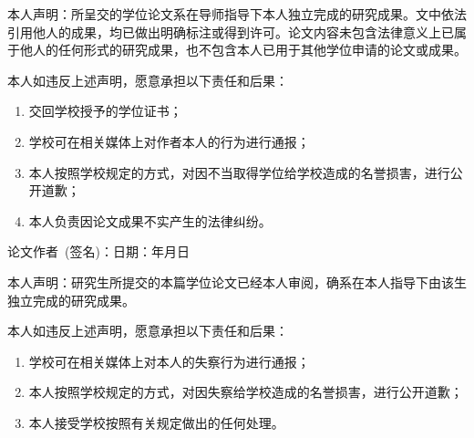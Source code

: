 
\fancyfoot[LE,RO]{}

\begin{center}\xiaowu\end{center}\vspace{-1cm}
\begin{center}\end{center}

本人声明：所呈交的学位论文系在导师指导下本人独立完成的研究成果。文中依法引用他人的成果，均已做出明确标注或得到许可。论文内容未包含法律意义上已属于他人的任何形式的研究成果，也不包含本人已用于其他学位申请的论文或成果。

本人如违反上述声明，愿意承担以下责任和后果：
\begin{enumerate}
\item 交回学校授予的学位证书；
\item 学校可在相关媒体上对作者本人的行为进行通报；
\item 本人按照学校规定的方式，对因不当取得学位给学校造成的名誉损害，进行公开道歉；
\item 本人负责因论文成果不实产生的法律纠纷。
\end{enumerate}

\vspace{1em}
论文作者~(签名)：\hfill 日期：\hspace{4em}年\hspace{2em}月\hspace{2em}日\hspace{4em}



\vspace{1em}
\begin{center}\end{center}

本人声明：研究生\underline{\quad\quad\quad}所提交的本篇学位论文已经本人审阅，确系在本人指导下由该生独立完成的研究成果。

本人如违反上述声明，愿意承担以下责任和后果：
\begin{enumerate}
\item 学校可在相关媒体上对本人的失察行为进行通报；
\item 本人按照学校规定的方式，对因失察给学校造成的名誉损害，进行公开道歉；
\item 本人接受学校按照有关规定做出的任何处理。
\end{enumerate}

